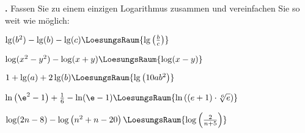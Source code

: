 \newpage


\textbf{\bbwAufgabenNummer{}.}
Fassen Sie zu einem einzigen Logarithmus zusammen und vereinfachen Sie
so weit wie möglich:

\begin{bbwAufgabenBlock}
\item $\lg(b^2) - \lg(b) - \lg(c) \LoesungsRaum{\lg\left(\frac{b}c\right)}$
\item $\log(x^2-y^2) - \log(x+y) \LoesungsRaum{\log(x-y)}$
\item $1+\lg(a)+2\lg(b)  \LoesungsRaum{\lg\left( 10ab^2 \right)}$
\item $\ln\left(\e^2-1\right) + \frac16 - \ln(\e-1) \LoesungsRaum{\ln\left((e+1)\cdot{}\sqrt[6]{e}\right)}$
\item $\log(2n-8) - \log\left(n^2+n-20\right) \LoesungsRaum{\log\left(\frac{2}{n+5}\right)}$

\end{bbwAufgabenBlock}



\platzFuerBerechnungenBisEndeSeite{}%
%
